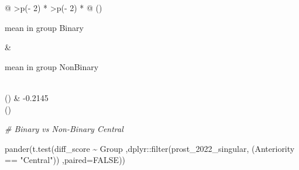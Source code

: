 \documentclass[
]{article}
\newenvironment{Shaded}{\begin{snugshade}}{\end{snugshade}}
\newcommand{\AttributeTok}[1]{\textcolor[rgb]{0.77,0.63,0.00}{#1}}
\newcommand{\CommentTok}[1]{\textcolor[rgb]{0.56,0.35,0.01}{\textit{#1}}}
\newcommand{\ConstantTok}[1]{\textcolor[rgb]{0.00,0.00,0.00}{#1}}
\newcommand{\FunctionTok}[1]{\textcolor[rgb]{0.00,0.00,0.00}{#1}}
\newcommand{\NormalTok}[1]{#1}
\newcommand{\SpecialCharTok}[1]{\textcolor[rgb]{0.00,0.00,0.00}{#1}}
\newcommand{\StringTok}[1]{\textcolor[rgb]{0.31,0.60,0.02}{#1}}
\begin{document}
\begin{longtable}[]{@{}
  >{\centering\arraybackslash}p{(\columnwidth - 2\tabcolsep) * }
  >{\centering\arraybackslash}p{(\columnwidth - 2\tabcolsep) * }@{}}
\toprule()
\begin{minipage}[b]{\linewidth}\centering
mean in group Binary
\end{minipage} & \begin{minipage}[b]{\linewidth}\centering
mean in group NonBinary
\end{minipage} \\
\midrule()
 & -0.2145 \\
\bottomrule()
\end{longtable}

\begin{Shaded}
\begin{Highlighting}[]
\CommentTok{\# Binary vs Non{-}Binary Central}

\FunctionTok{pander}\NormalTok{(}\FunctionTok{t.test}\NormalTok{(diff\_score }\SpecialCharTok{\textasciitilde{}}\NormalTok{ Group}
\NormalTok{       ,dplyr}\SpecialCharTok{::}\FunctionTok{filter}\NormalTok{(prost\_2022\_singular, (Anteriority }\SpecialCharTok{==} \StringTok{"Central"}\NormalTok{))}
\NormalTok{       ,}\AttributeTok{paired=}\ConstantTok{FALSE}\NormalTok{))}
\end{Highlighting}
\end{Shaded}
\end{document}

